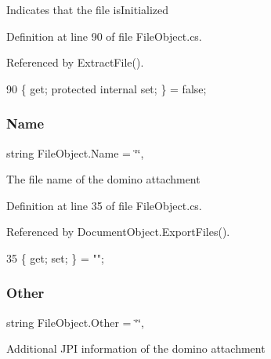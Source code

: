 Indicates that the file is\+Initialized 



Definition at line 90 of file File\+Object.\+cs.



Referenced by Extract\+File().


\begin{DoxyCode}
90 \{ \textcolor{keyword}{get}; \textcolor{keyword}{protected} \textcolor{keyword}{internal} \textcolor{keyword}{set}; \} = \textcolor{keyword}{false};
\end{DoxyCode}
\mbox{\label{class_file_object_a9d47aff166393cb47490da2661576d62}} 
\subsubsection{\texorpdfstring{Name}{Name}}
{\footnotesize\ttfamily string File\+Object.\+Name = \char`\"{}\char`\"{}\hspace{0.3cm}{\ttfamily [get]}, {\ttfamily [set]}}



The file name of the domino attachment 



Definition at line 35 of file File\+Object.\+cs.



Referenced by Document\+Object.\+Export\+Files().


\begin{DoxyCode}
35 \{ \textcolor{keyword}{get}; \textcolor{keyword}{set}; \} = \textcolor{stringliteral}{""};
\end{DoxyCode}
\mbox{\label{class_file_object_ab91b5eca56a04784f8d0187247e1280c}} 
\subsubsection{\texorpdfstring{Other}{Other}}
{\footnotesize\ttfamily string File\+Object.\+Other = \char`\"{}\char`\"{}\hspace{0.3cm}{\ttfamily [get]}, {\ttfamily [set]}}



Additional J\+PI information of the domino attachment 



